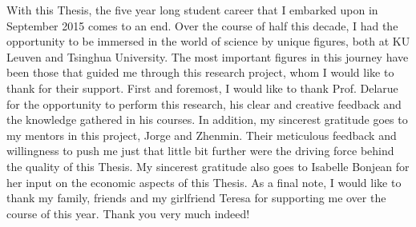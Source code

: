 \documentclass[master=ene,english]{kulemt}
\begin{document}
\begin{preface}
With this Thesis, the five year long student career that I embarked upon in September 2015 comes to an end. Over the course of half this decade, I had the opportunity to be immersed in the world of science by unique figures, both at KU Leuven and Tsinghua University. The most important figures in this journey have been those that guided me through this research project, whom I would like to thank for their support.
\newline \newline
First and foremost, I would like to thank Prof. Delarue for the opportunity to perform this research, his clear and creative feedback and the knowledge gathered in his courses. In addition, my sincerest gratitude goes to my mentors in this project, Jorge and Zhenmin. Their meticulous feedback and willingness to push me just that little bit further were the driving force behind the quality of this Thesis. My sincerest gratitude also goes to Isabelle Bonjean for her input on the economic aspects of this Thesis. As a final note, I would like to thank my family, friends and my girlfriend Teresa for supporting me over the course of this year. Thank you very much indeed! 
\end{preface}

\tableofcontents*
\end{document}
